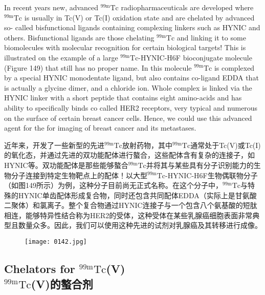 \documentclass[dvipsnames, svgnames,a4paper,11pt]{article}
\begin{document}
In recent years new, advanced ${}^\mathrm{99m}\mathrm{Tc}$ radiopharmaceuticals are developed where
${}^\mathrm{99m}\mathrm{Tc}$ is usually in Tc(V) or Tc(I) oxidation state and are chelated by advanced so-
called bisfunctional ligands containing complexing linkers such as HYNIC and others.
Bisfunctional ligands are those chelating ${}^\mathrm{99m}\mathrm{Tc}$ and linking it to some biomolecules
with molecular recognition for certain biological targets! This is illustrated on the
example of a large ${}^\mathrm{99m}\mathrm{Tc}$-HYNIC-H6F bioconjugate molecule (Figure 149) that still
has no proper name. In this molecule ${}^\mathrm{99m}\mathrm{Tc}$ is complexed by a special HYNIC
monodentate ligand, but also contains co-ligand EDDA that is actually a glycine
dimer, and a chloride ion. Whole complex is linked via the HYNIC linker with a short
peptide that contains eight amino-acids and has ability to specifically binds co called
HER2 receptors, very typical and numerous on the surface of certain breast cancer
cells. Hence, we could use this advanced agent for the for imaging of breast cancer
and its metastases.

近年来，开发了一些新型的先进${}^\mathrm{99m}\mathrm{Tc}$放射药物，其中${}^\mathrm{99m}\mathrm{Tc}$通常处于Tc(V)或Tc(I)的氧化态，并通过先进的双功能配体进行螯合，这些配体含有复杂的连接子，如HYNIC等。双功能配体是那些能够螯合${}^\mathrm{99m}\mathrm{Tc}$并将其与某些具有分子识别能力的生物分子连接到特定生物靶点上的配体！以大型${}^\mathrm{99m}\mathrm{Tc}$-HYNIC-H6F生物偶联物分子（如图149所示）为例，这种分子目前尚无正式名称。在这个分子中，${}^\mathrm{99m}\mathrm{Tc}$与特殊的HYNIC单齿配体形成复合物，同时还包含共同配体EDDA（实际上是甘氨酸二聚体）和氯离子。整个复合物通过HYNIC连接子与一个包含八个氨基酸的短肽相连，能够特异性结合称为HER2的受体，这种受体在某些乳腺癌细胞表面非常典型且数量众多。因此，我们可以使用这种先进的试剂对乳腺癌及其转移进行成像。

\begin{figure}[h]
	\centering
    \texttt{[image: 0142.jpg]}    
     \label{fig149}
\end{figure}

\subsection{Chelators for ${}^\mathrm{99m}\mathrm{Tc}$(V) \\${}^\mathrm{99m}\mathrm{Tc}$(V)的螯合剂}
\end{document}
